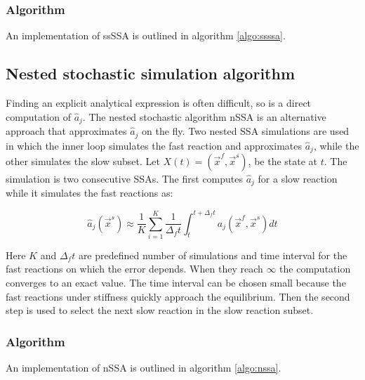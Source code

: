     \subsubsection{Algorithm}
    An implementation of ssSSA is outlined in algorithm \ref{algo:ssssa}.

    

  \subsection{Nested stochastic simulation algorithm}
  Finding an explicit analytical expression is often difficult, so is a direct computation of $\hat{a}_j$.
  The nested stochastic algorithm nSSA is an alternative approach that approximates $\hat{a}_j$ on the fly.
  Two nested SSA simulations are used in which the inner loop simulates the fast reaction and approximates $\hat{a}_j$, while the other simulates the slow subset.
  Let $X(t) = (\vec{x}^f,\vec{x}^s)$, be the state at $t$.
  The simulation is two consecutive SSAs.
  The first computes $\hat{a}_j$ for a slow reaction while it simulates the fast reactions as:

  $$\hat{a}_j(\vec{x}^s)\approx\frac{1}{K}\sum\limits_{i=1}^K\frac{1}{\Delta_{f}t}\int_{t}^{t+\Delta_ft}a_j(\vec{x}^f, \vec{x}^s)dt$$

  Here $K$ and $\Delta_ft$ are predefined number of simulations and time interval for the fast reactions on which the error depends.
  When they reach $\infty$ the computation converges to an exact value.
  The time interval can be chosen small because the fast reactions under stiffness quickly approach the equilibrium.
  Then the second step is used to select the next slow reaction in the slow reaction subset.

    \subsubsection{Algorithm}
    An implementation of nSSA is outlined in algorithm \ref{algo:nssa}.

    
